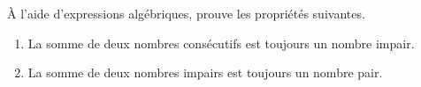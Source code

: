 \begin{solution}

\end{solution}
\newpage
\begin{exercise}[points=2]
    À l'aide d'expressions algébriques, prouve les propriétés suivantes.
    \begin{enumerate}[itemsep=4cm]
        \item La somme de deux nombres consécutifs est toujours un nombre impair.
        \item La somme de deux nombres impairs est toujours un nombre pair.
    \end{enumerate}
    \vspace*{4cm}
\end{exercise}
\begin{solution}

\end{solution}

